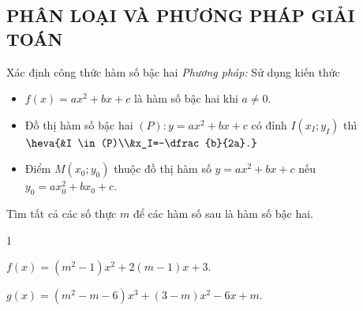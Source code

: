 \subsection{PHÂN LOẠI VÀ PHƯƠNG PHÁP GIẢI TOÁN}
\begin{dang}{Xác định công thức hàm số bậc hai}
	\textit{Phương pháp:} Sử dụng kiến thức
	\begin{itemize}
		\item $ f(x)=ax^2+bx+c $ là hàm số bậc hai khi $ a\ne 0 $.
		\item Đồ thị hàm số bậc hai $ (P)\colon y=ax^2+bx+c $ có đỉnh $ I(x_I;y_I)$ thì $\heva{&I \in (P)\\&x_I=-\dfrac{b}{2a}.}$
		\item Điểm $M(x_0; y_0)$ thuộc đồ thị hàm số $y = ax^2 + bx + c$ nếu $y_0 = ax_0^2 + bx_0 + c$.
	\end{itemize}

\end{dang}
\begin{vd}%
	Tìm tất cả các số thực $ m $ để các hàm số sau là hàm số bậc hai.
	\begin{enumEX}{1}
		\item $ f(x)=(m^2-1)x^2+2(m-1)x+3 $.
		\item $ g(x)=(m^2-m-6)x^3+(3-m)x^2-6x+m $.
	\end{enumEX}
\end{vd}


